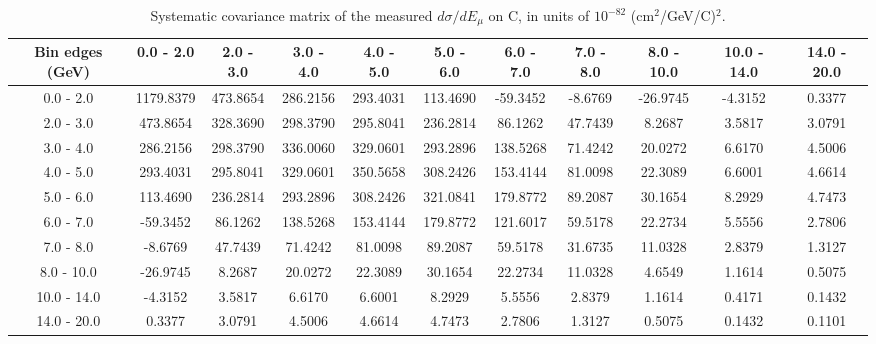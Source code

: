 \documentclass[aps,prl,twocolumn,superscriptaddress,nofootinbib]{revtex4-1}
\begin{document}
\begin{turnpage}
 \begin{table}[h!]
  \centering
  \caption{Systematic covariance matrix of the measured $d\sigma/dE_{\mu}$ on C, in units of $10^{-82}$ (cm$^{2}$/GeV/C)$^{2}$.}
    \begin{tabular}{c||cccccccccc}
      Bin edges (GeV) & 0.0 - 2.0 & 2.0 - 3.0 & 3.0 - 4.0 & 4.0 - 5.0 & 5.0 - 6.0 & 6.0 - 7.0 & 7.0 - 8.0 & 8.0 - 10.0 & 10.0 - 14.0 & 14.0 - 20.0 \\
\hline \hline
        0.0 - 2.0 & 1179.8379 & 473.8654 & 286.2156 & 293.4031 & 113.4690 & -59.3452 & -8.6769 & -26.9745 & -4.3152 &  0.3377 \\
        2.0 - 3.0 & 473.8654 & 328.3690 & 298.3790 & 295.8041 & 236.2814 & 86.1262 & 47.7439 &  8.2687 &  3.5817 &  3.0791 \\
        3.0 - 4.0 & 286.2156 & 298.3790 & 336.0060 & 329.0601 & 293.2896 & 138.5268 & 71.4242 & 20.0272 &  6.6170 &  4.5006 \\
        4.0 - 5.0 & 293.4031 & 295.8041 & 329.0601 & 350.5658 & 308.2426 & 153.4144 & 81.0098 & 22.3089 &  6.6001 &  4.6614 \\
        5.0 - 6.0 & 113.4690 & 236.2814 & 293.2896 & 308.2426 & 321.0841 & 179.8772 & 89.2087 & 30.1654 &  8.2929 &  4.7473 \\
        6.0 - 7.0 & -59.3452 & 86.1262 & 138.5268 & 153.4144 & 179.8772 & 121.6017 & 59.5178 & 22.2734 &  5.5556 &  2.7806 \\
        7.0 - 8.0 & -8.6769 & 47.7439 & 71.4242 & 81.0098 & 89.2087 & 59.5178 & 31.6735 & 11.0328 &  2.8379 &  1.3127 \\
       8.0 - 10.0 & -26.9745 &  8.2687 & 20.0272 & 22.3089 & 30.1654 & 22.2734 & 11.0328 &  4.6549 &  1.1614 &  0.5075 \\
      10.0 - 14.0 & -4.3152 &  3.5817 &  6.6170 &  6.6001 &  8.2929 &  5.5556 &  2.8379 &  1.1614 &  0.4171 &  0.1432 \\
      14.0 - 20.0 &  0.3377 &  3.0791 &  4.5006 &  4.6614 &  4.7473 &  2.7806 &  1.3127 &  0.5075 &  0.1432 &  0.1101 \\
    \end{tabular}
  \label{tablecov:C_Systematic_Emu}
  \end{table}
\end{turnpage}
\end{document}
